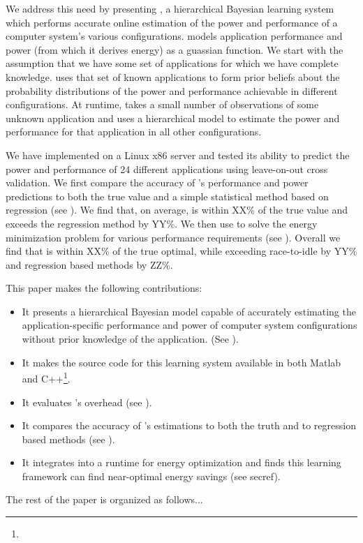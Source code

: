 We address this need by presenting \SYSTEMLEO{}, a hierarchical Bayesian learning system which performs accurate online estimation of the power and performance of a computer system's various configurations.  \SYSTEMLEO{} models application performance and power (from which it derives energy) as a guassian function.  We start with the assumption that we have some set of applications for which we have complete knowledge.  \SYSTEMLEO{} uses that set of known applications to form prior beliefs about the probability distributions of the power and performance achievable in different configurations.  At runtime, \SYSTEMLEO{} takes a small number of observations of some unknown application and uses a hierarchical model to estimate the power and performance for that application in all other configurations.

We have implemented \SYSTEMLEO{} on a Linux x86 server and tested its ability to predict the power and performance of 24 different applications using leave-on-out cross validation.  We first compare the accuracy of \SYSTEMLEO{}'s performance and power predictions to both the true value and a simple statistical method based on regression (see \secref{}).  We find that, on average, \SYSTEMLEO{} is within XX\% of the true value and exceeds the regression method by YY\%.  We then use \SYSTEMLEO{} to solve the energy minimization problem for various performance requirements (see \secref{}).  Overall we find that \SYSTEMLEO{} is within XX\% of the true optimal, while exceeding race-to-idle by YY\% and regression based methods by ZZ\%.

This paper makes the following contributions:
\begin{itemize}
\item It presents a hierarchical Bayesian model capable of accurately estimating the application-specific performance and power of computer system configurations without prior knowledge of the application. (See ).
\item It makes the source code for this learning system available in both Matlab and C++\footnote{}.
\item It evaluates \SYSTEMLEO{}'s overhead (see ).
\item It compares the accuracy of \SYSTEMLEO{}'s estimations to both the truth and to regression based methods (see \secref{}).
\item It integrates \SYSTEMLEO{} into a runtime for energy optimization and finds this learning framework can find near-optimal energy savings (see secref{}).
\end{itemize}

The rest of the paper is organized as follows...
